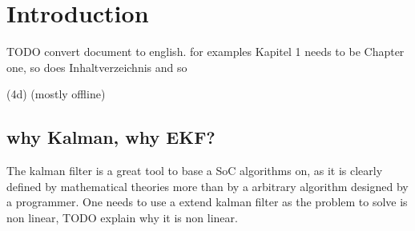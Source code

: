 

\chapter{Introduction}

TODO convert document to english. for examples Kapitel 1 needs to be Chapter one, so does Inhaltverzeichnis and so 

(4d) (mostly offline)




\section{why Kalman, why EKF?}

\cite{espedal2021current}

The kalman filter is a great tool to base a SoC algorithms on, as it is clearly defined by mathematical theories more than by a arbitrary algorithm designed by a programmer. One needs to use a extend kalman filter as the problem to solve is non linear, TODO explain why it is non linear. 

